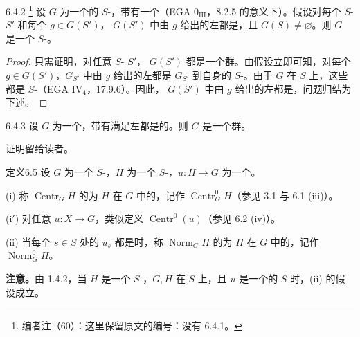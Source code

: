 \begin{SGAresult}{}{6.4.2}
\footnote{编者注（60）：这里保留原文的编号：没有 6.4.1。}
设 $G$ 为一个的 $S$-，带有一个（EGA $0_{\mathrm{III}}$，8.2.5 的意义下）。假设对每个 $S$- $S'$ 和每个 $g\in G(S')$， $G(S')$ 中由 $g$ 给出的左都是，且 $G(S)\ne\varnothing$。则 $G$ 是一个 $S$-。
\end{SGAresult}
\begin{proof}
只需证明，对任意 $S$- $S'$， $G(S')$ 都是一个群。由假设立即可知，对每个 $g\in G(S')$，$G_{S'}$ 中由 $g$ 给出的左都是 $G_{S'}$ 到自身的 $S$-。由于 $G$ 在 $S$ 上，这些都是 $S$-（EGA $\mathrm{IV}_4$，17.9.6）。因此， $G(S')$ 中由 $g$ 给出的左都是，问题归结为下述。
\end{proof}
\begin{SGAresult}{}{6.4.3}
设 $G$ 为一个，带有满足左都是的。则 $G$ 是一个群。
\end{SGAresult}
证明留给读者。

\begin{SGAresult}{定义}{6.5}
设 $G$ 为一个 $S$-，$H$ 为一个 $S$-，$u:H\to G$ 为一个。

(i) 称 $\operatorname{Centr}_G H$ 的为 $H$ 在 $G$ 中的，记作 $\operatorname{Centr}^0_G H$（参见 3.1 与 6.1 (iii)）。

(i$'$) 对任意 $u:X\to G$，类似定义 $\operatorname{Centr}^0(u)$（参见 6.2 (iv)）。

(ii) 当每个 $s\in S$ 处的 $u_s$ 都是时，称 $\operatorname{Norm}_G H$ 的为 $H$ 在 $G$ 中的，记作 $\operatorname{Norm}^0_G H$。
\end{SGAresult}
\textbf{注意。}由 1.4.2，当 $H$ 是一个 $S$-，$G,H$ 在 $S$ 上，且 $u$ 是一个的 $S$-时，(ii) 的假设成立。

